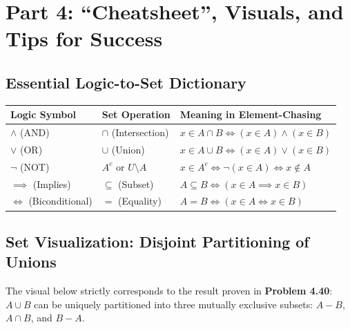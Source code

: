 \documentclass[11pt]{article}
\begin{document}
\section{Part 4: ``Cheatsheet'', Visuals, and Tips for Success}

\subsection{Essential Logic-to-Set Dictionary}
\begin{center}
\begin{tabular}{|l|l|l|}
\hline
\textbf{Logic Symbol} & \textbf{Set Operation} & \textbf{Meaning in Element-Chasing} \\ \hline
$\land$ (AND) & $\cap$ (Intersection) & $x \in A \cap B \iff (x \in A) \land (x \in B)$ \\ \hline
$\lor$ (OR) & $\cup$ (Union) & $x \in A \cup B \iff (x \in A) \lor (x \in B)$ \\ \hline
$\neg$ (NOT) & $A^c$ or $U \setminus A$ & $x \in A^c \iff \neg(x \in A) \iff x \notin A$ \\ \hline
$\implies$ (Implies) & $\subseteq$ (Subset) & $A \subseteq B \iff (x \in A \implies x \in B)$ \\ \hline
$\iff$ (Biconditional) & $=$ (Equality) & $A = B \iff (x \in A \iff x \in B)$ \\ \hline
\end{tabular}
\end{center}

\subsection{Set Visualization: Disjoint Partitioning of Unions}
The visual below strictly corresponds to the result proven in \textbf{Problem 4.40}: $A \cup B$ can be uniquely partitioned into three mutually exclusive subsets: $A - B$, $A \cap B$, and $B - A$.
\end{document}
